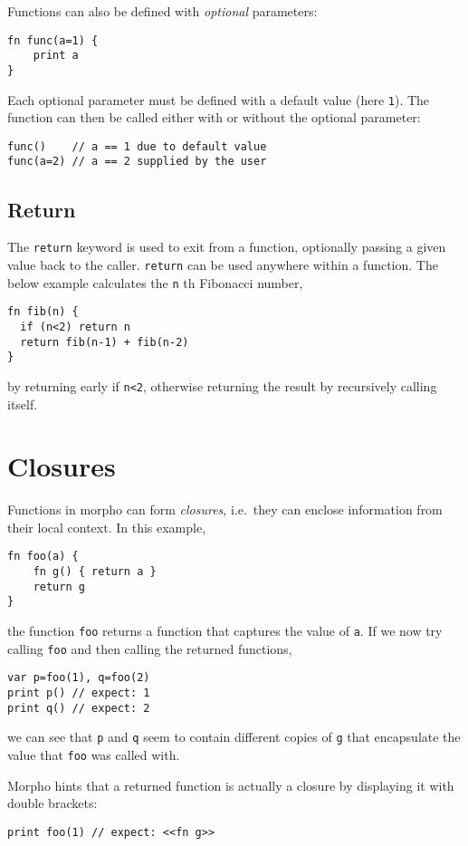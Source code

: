 Functions can also be defined with \emph{optional} parameters:

\begin{lstlisting}
fn func(a=1) {
    print a 
}
\end{lstlisting}

Each optional parameter must be defined with a default value (here
\texttt{1}). The function can then be called either with or without the
optional parameter:

\begin{lstlisting}
func()    // a == 1 due to default value
func(a=2) // a == 2 supplied by the user
\end{lstlisting}

\hypertarget{return}{%
\subsection{Return}\label{return}}

The \texttt{return} keyword is used to exit from a function, optionally
passing a given value back to the caller. \texttt{return} can be used
anywhere within a function. The below example calculates the \texttt{n}
th Fibonacci number,

\begin{lstlisting}
fn fib(n) {
  if (n<2) return n
  return fib(n-1) + fib(n-2)
}
\end{lstlisting}

by returning early if \texttt{n\textless{}2}, otherwise returning the
result by recursively calling itself.

\hypertarget{closures}{%
\section{Closures}\label{closures}}

Functions in morpho can form \emph{closures}, i.e.~they can enclose
information from their local context. In this example,

\begin{lstlisting}
fn foo(a) {
    fn g() { return a } 
    return g
}
\end{lstlisting}

the function \texttt{foo} returns a function that captures the value of
\texttt{a}. If we now try calling \texttt{foo} and then calling the
returned functions,

\begin{lstlisting}
var p=foo(1), q=foo(2) 
print p() // expect: 1 
print q() // expect: 2
\end{lstlisting}

we can see that \texttt{p} and \texttt{q} seem to contain different
copies of \texttt{g} that encapsulate the value that \texttt{foo} was
called with.

Morpho hints that a returned function is actually a closure by
displaying it with double brackets:

\begin{lstlisting}
print foo(1) // expect: <<fn g>> 
\end{lstlisting}
